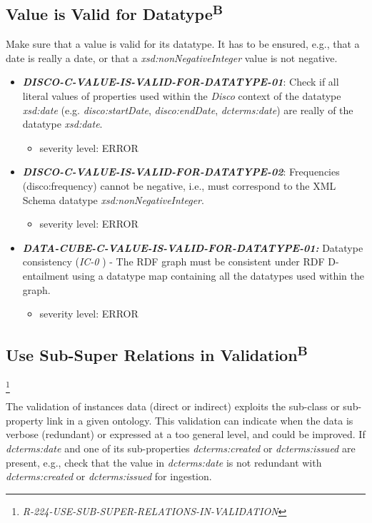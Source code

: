 \documentclass{llncs}
\begin{document}
\subsection{Value is Valid for Datatype\textsuperscript{B}}

Make sure that a value is valid for its datatype.
It has to be ensured, e.g., that a date is really a date, or that a \emph{xsd:nonNegativeInteger} value is not negative. 

\begin{itemize}
	\item \textbf{{\em DISCO-C-VALUE-IS-VALID-FOR-DATATYPE-01}}: 
	Check if all literal values of properties used within the \emph{Disco} context of the datatype {\em xsd:date} (e.g. {\em disco:startDate}, {\em disco:endDate}, {\em dcterms:date}) are really of the datatype {\em xsd:date}.
	\begin{itemize}
		\item severity level: ERROR
	\end{itemize}
	\item \textbf{{\em DISCO-C-VALUE-IS-VALID-FOR-DATATYPE-02}}: 
	Frequencies (disco:frequency) cannot be negative, i.e., must correspond  to the XML Schema datatype \emph{xsd:nonNegativeInteger}.
	\begin{itemize}
		\item severity level: ERROR
	\end{itemize}
\end{itemize}

\begin{itemize}
	\item \textbf{{\em DATA-CUBE-C-VALUE-IS-VALID-FOR-DATATYPE-01:}}
	Datatype consistency (\emph{IC-0} \cite{CyganiakReynolds2014}) -  
	The RDF graph must be consistent under RDF D-entailment using a datatype map containing all the datatypes used within the graph. 
	\begin{itemize}
		\item severity level: ERROR
	\end{itemize}
\end{itemize}

\subsection{Use Sub-Super Relations in Validation\textsuperscript{B}}

\footnote{\emph{R-224-USE-SUB-SUPER-RELATIONS-IN-VALIDATION}}

The validation of instances data (direct or indirect) exploits the sub-class or sub-property link in a given ontology.
This validation can indicate when the data is verbose (redundant) or expressed at a too general level, and could be improved.
If \emph{dcterms:date} and one of its sub-properties \emph{dcterms:created} or \emph{dcterms:issued} are present, e.g., check that the value in \emph{dcterms:date} is not redundant with \emph{dcterms:created} or \emph{dcterms:issued} for ingestion.
\end{document}
